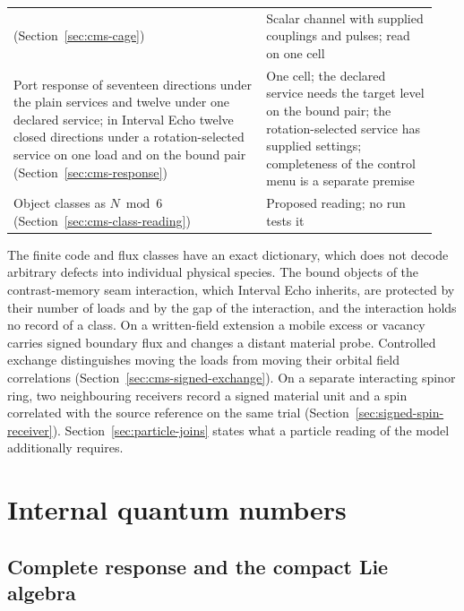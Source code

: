 \documentclass[11pt]{article}
\begin{document}
\begin{table}[htbp]
\begin{tabular}{@{}>{\raggedright\arraybackslash}p{0.56\linewidth}>{\raggedright\arraybackslash}p{0.38\linewidth}@{}}
(Section~\ref{sec:cms-cage}) &
Scalar channel with supplied couplings and pulses; read on one cell\\
Port response of seventeen directions under the plain services and twelve
under one declared service; in Interval Echo twelve closed directions under a
rotation-selected service on one load and on the bound pair
(Section~\ref{sec:cms-response}) &
One cell; the declared service needs the target level on the bound pair; the
rotation-selected service has supplied settings; completeness of the control
menu is a separate premise\\
Object classes as $N\bmod6$ (Section~\ref{sec:cms-class-reading}) &
Proposed reading; no run tests it\\
\bottomrule
\end{tabular}
\end{table}

The finite code and flux classes have an exact dictionary, which does not
decode arbitrary defects into individual physical species. The bound objects
of the contrast-memory seam interaction, which Interval Echo inherits, are
protected by their number of loads and by the gap of the interaction, and the
interaction holds no record of a class.
On a written-field extension a mobile excess or vacancy carries signed
boundary flux and changes a distant material probe. Controlled exchange
distinguishes moving the loads from moving their orbital field correlations
(Section~\ref{sec:cms-signed-exchange}).
On a separate interacting spinor ring, two neighbouring receivers record
a signed material unit and a spin correlated with the source reference on
the same trial (Section~\ref{sec:signed-spin-receiver}).
Section~\ref{sec:particle-joins} states what a particle reading of the model
additionally requires.

\tableofcontents



\section{Internal quantum numbers}
\label{sec:finite-supply}

\subsection{Complete response and the compact Lie algebra}
\end{document}
